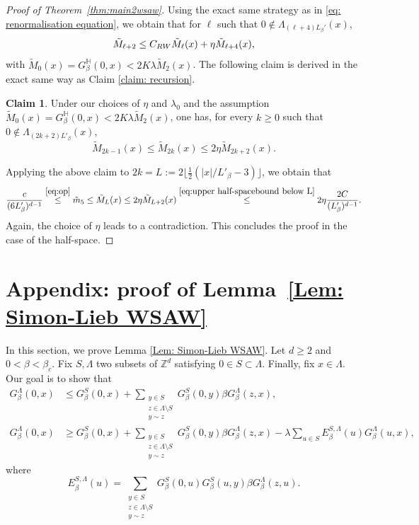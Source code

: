 \documentclass[11pt,a4paper]{article}
\numberwithin{equation}{section}
\theoremstyle{plain}
\theoremstyle{definition}
\newtheorem{Claim}[Thm]{Claim}
\begin{document}
\begin{proof}[Proof of Theorem~\textup{\ref{thm:main2wsaw}}]
Using the exact same strategy as in \eqref{eq: renormalisation equation}, we obtain that for $\ell$ such that $0\notin \Lambda_{(\ell+4)L_\beta'}(x)$, 
\begin{equation}
	\tilde{M}_{\ell+2}\leq C_{\rm RW}\tilde{M}_\ell(x)+\eta \tilde{M}_{\ell+4}(x),
\end{equation}
with $\tilde M_0(x)=G_\beta^{\mathbb H}(0,x)<2K\lambda \tilde{M}_2(x)$. The following claim is derived in the exact same way as Claim \ref{claim: recursion}.
\begin{Claim}\label{claim: recursion half} Under our choices of $\eta$ and $\lambda_0$ and the assumption $\tilde{M}_0(x)=G_\beta^{\mathbb H}(0,x)<2K\lambda \tilde{M}_2(x)$, one has, for every $k\geq 0$ such that $0\notin \Lambda_{(2k+2)L'_\beta}(x)$,
\begin{equation}\label{eq:recursive bound}
\tilde{M}_{2k-1}(x)\le \tilde{M}_{2k}(x)\le 2\eta \tilde{M}_{2k+2}(x).\end{equation}
\end{Claim}
Applying the above claim to $2k=L:=2\lfloor \tfrac{1}{2}(|x|/L'_\beta-3)\rfloor$, we obtain that 
\begin{equation}
\frac{c}{(6L'_\beta)^{d-1}}\stackrel{\eqref{eq:op}}\le \tilde{m}_5\le \tilde{M}_{L}(x)\le 2\eta \tilde{M}_{L+2}(x)\stackrel{\eqref{eq:upper half-spacebound below L}}\le 2\eta \frac{2C}{(L'_\beta)^{d-1}}.\end{equation}
Again, the choice of $\eta$  leads to a contradiction. This concludes the proof in the case of the half-space.

\end{proof}


\appendix
\section{Appendix: proof of Lemma~\ref{Lem: Simon-Lieb WSAW}}\label{appendix:sl}

In this section, we prove Lemma \ref{Lem: Simon-Lieb WSAW}. Let $d\geq 2$ and $0<\beta<\beta_c$. Fix $S,\Lambda$ two subsets of $\mathbb Z^d$ satisfying $0\in S\subset \Lambda$. Finally, fix $x\in \Lambda$. Our goal is to show that
\begin{align}\label{eq:SLproof}
G_\beta^\Lambda(0,x)&\le G_\beta^S(0,x)+ \sum_{\substack{y\in S\\ z\in \Lambda\setminus S\\ y\sim z}}G_\beta^S(0,y)\beta G_\beta^\Lambda(z,x),\\
G_\beta^\Lambda(0,x)&\ge G_\beta^S(0,x)+\sum_{\substack{y\in S\\ z\in \Lambda\setminus S\\ y\sim z}}G_\beta^S(0,y)\beta G_\beta^\Lambda(z,x)- \lambda \sum_{u\in S}E_\beta^{S,\Lambda}(u)G_\beta^\Lambda(u,x),\label{eq:reversed SLproof}
\end{align}
where 
\begin{equation}
E_\beta^{S,\Lambda}(u)=\sum_{\substack{y \in S\\ z\in \Lambda\setminus S\\ y\sim z}}G_\beta^S(0,u)G_\beta^S(u,y) \beta G_\beta^\Lambda(z,u).
\end{equation}
\end{document}
